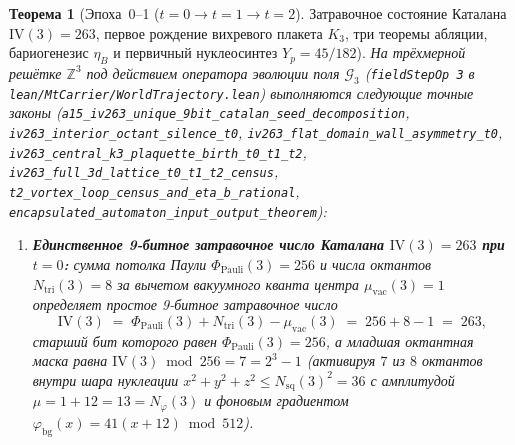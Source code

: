 \documentclass[11pt,a4paper]{article}
\theoremstyle{plain}
\newtheorem{theorem}{Теорема}[section]
\theoremstyle{definition}
\begin{document}
\begin{theorem}[Эпоха~0--1 ($t = 0 \to t = 1 \to t = 2$). Затравочное состояние Каталана $\mathrm{IV}(3) = 263$, первое рождение вихревого плакета $K_3$, три теоремы абляции, бариогенезис $\eta_B$ и первичный нуклеосинтез $Y_p = 45/182$]
\label{thm:first-vortex-birth-iv263}
На трёхмерной решётке $\mathbb{Z}^3$ под действием оператора эволюции поля $\mathcal{G}_3$ (\texttt{fieldStepOp 3} в \texttt{lean/MtCarrier/WorldTrajectory.lean}) выполняются следующие точные законы (\texttt{a15\_iv263\_unique\_9bit\_catalan\_seed\_decomposition}, \texttt{iv263\_interior\_octant\_silence\_t0}, \texttt{iv263\_flat\_domain\_wall\_asymmetry\_t0}, \texttt{iv263\_central\_k3\_plaquette\_birth\_t0\_t1\_t2}, \texttt{iv263\_full\_3d\_lattice\_t0\_t1\_t2\_census}, \texttt{t2\_vortex\_loop\_census\_and\_eta\_b\_rational}, \texttt{encapsulated\_automaton\_input\_output\_theorem}):
\begin{enumerate}[label=\textbf{(\arabic*)},leftmargin=*]
\item \textbf{Единственное 9-битное затравочное число Каталана $\mathrm{IV}(3) = 263$ при $t = 0$:}
  сумма потолка Паули $\Phi_{\mathrm{Pauli}}(3) = 256$ и числа октантов $N_{\mathrm{tri}}(3) = 8$ за вычетом вакуумного кванта центра $\mu_{\mathrm{vac}}(3) = 1$ определяет простое 9-битное затравочное число
  \begin{equation}
    \label{eq:iv263-seed-def}
    \mathrm{IV}(3) \;=\; \Phi_{\mathrm{Pauli}}(3) + N_{\mathrm{tri}}(3) - \mu_{\mathrm{vac}}(3) \;=\; 256 + 8 - 1 \;=\; 263,
  \end{equation}
  старший бит которого равен $\Phi_{\mathrm{Pauli}}(3) = 256$, а младшая октантная маска равна $\mathrm{IV}(3) \bmod 256 = 7 = 2^3 - 1$ (активируя $7$ из $8$ октантов внутри шара нуклеации $x^2 + y^2 + z^2 \le N_{\mathrm{sq}}(3)^2 = 36$ с амплитудой $\mu = 1 + 12 = 13 = N_\varphi(3)$ и фоновым градиентом $\varphi_{\mathrm{bg}}(x) = 41(x + 12) \bmod 512$).


\end{enumerate}
\end{theorem}
\end{document}
